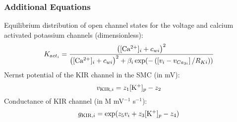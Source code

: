 \subsubsection*{Additional Equations}
%
Equilibrium distribution of open channel states for the voltage and calcium activated potassium channels (dimensionless):
\begin{equation} \label{eq:Kacti}
K_{act_{i}}= \frac{  \left( \text{[Ca$^{2+}$]$_i$} + c_{wi}\right)^{2}}    {\left( \text{[Ca$^{2+}$]$_i$} + c_{wi} \right)^{2}    + \beta_{i} \exp( -\left(   \left[ v_{i}-v_{Ca_{3i}}\right] /R_{Ki}   \right) )      }
\end{equation}
%
Nernst potential of the KIR channel in the SMC (in mV):
\begin{equation}\label{eq:vKIR}
v_{\text{KIR},i} = z_1 [\text{K$^+$}]_p-z_2
\end{equation}
%
Conductance of KIR channel (in  \textmu M mV$^{-1}$ s$^{-1}$):
\begin{equation}\label{eq:gKIR}
g_{\text{KIR},i} = \exp(z_5v_i +z_3 [\text{K$^+$}]_p - z_4)
\end{equation}
%
%
%
